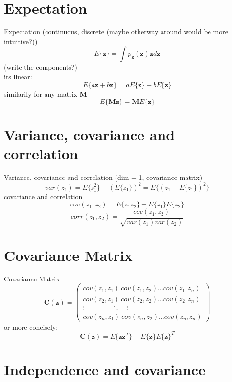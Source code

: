 \documentclass{beamer}
\begin{document}
\section{Expectation}

\begin{frame}{Expectation}
  (continuous, discrete (maybe otherway around would be more intuitive?))
  \[
  E\{\mathbf{z}\} = \int p_{\mathbf{z}}(\mathbf{z})\mathbf{z}d\mathbf{z}
  \]
  (write the components?)\\
  its linear:
  \[
  E\{a\mathbf{z} + b\mathbf{z}\}  = aE\{\mathbf{z}\} + bE\{\mathbf{z}\}
  \]
  similarily for any matrix $\mathbf{M}$
  \[
  E\{\mathbf{Mz}\} = \mathbf{M}E\{\mathbf{z}\}
  \]
\end{frame}

\section{Variance, covariance and correlation}

\begin{frame}{Variance, covariance and correlation}
  (dim = 1, covariance matrix)
  \[
  var(z_1)= E\{z_1^2\}-(E\{z_1\})^2 = E\{(z_1-E\{z_1\})^2\}
  \]
  covariance and correlation
  \[
  cov(z_1, z_2) = E\{z_1 z_2\} - E\{z_1\}E\{z_2\}
  \]
  \[
  corr(z_1,z_2) = \frac{cov(z_1, z_2)}{\sqrt{var(z_1)var(z_2)}}
  \]

\end{frame}

\section{Covariance Matrix}

\begin{frame}{Covariance Matrix}
  \[
  \mathbf{C}(\mathbf{z}) =
  \begin{pmatrix}
    cov(z_1, z_1) \ cov(z_1, z_2) \ldots cov(z_1, z_n) \\
    cov(z_2, z_1) \ cov(z_2, z_2) \ldots cov(z_2, z_n) \\
    \vdots \qquad \qquad \ddots \quad \vdots \\
    cov(z_n, z_1) \ cov(z_n, z_2) \ldots cov(z_n, z_n)
  \end{pmatrix}
  \]
  or more concisely:
  \[ \mathbf{C}(\mathbf{z}) =
  E\{\mathbf{zz}^T\} - E\{\mathbf{z}\} E\{\mathbf{z}\}^T\]
\end{frame}

\section{Independence and covariance}
\end{document}
